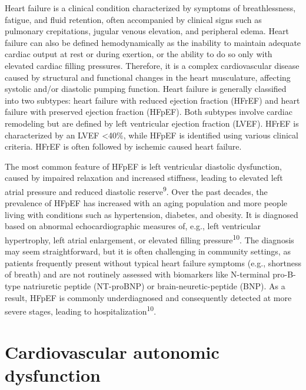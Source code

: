 \documentclass[
  a4paper,
  headsepline=true,
  open=any]{scrbook}
\begin{document}
Heart failure is a clinical condition characterized by symptoms of
breathlessness, fatigue, and fluid retention, often accompanied by
clinical signs such as pulmonary crepitations, jugular venous elevation,
and peripheral edema. Heart failure can also be defined hemodynamically
as the inability to maintain adequate cardiac output at rest or during
exertion, or the ability to do so only with elevated cardiac filling
pressures. Therefore, it is a complex cardiovascular disease caused by
structural and functional changes in the heart musculature, affecting
systolic and/or diastolic pumping function. Heart failure is generally
classified into two subtypes: heart failure with reduced ejection
fraction (HFrEF) and heart failure with preserved ejection fraction
(HFpEF). Both subtypes involve cardiac remodeling but are defined by
left ventricular ejection fraction (LVEF). HFrEF is characterized by an
LVEF \textless40\%, while HFpEF is identified using various clinical
criteria. HFrEF is often followed by ischemic caused heart failure.

The most common feature of HFpEF is left ventricular diastolic
dysfunction, caused by impaired relaxation and increased stiffness,
leading to elevated left atrial pressure and reduced diastolic
reserve\textsuperscript{9}. Over the past decades, the prevalence of
HFpEF has increased with an aging population and more people living with
conditions such as hypertension, diabetes, and obesity. It is diagnosed
based on abnormal echocardiographic measures of, e.g., left ventricular
hypertrophy, left atrial enlargement, or elevated filling
pressure\textsuperscript{10}. The diagnosis may seem straightforward,
but it is often challenging in community settings, as patients
frequently present without typical heart failure symptoms (e.g.,
shortness of breath) and are not routinely assessed with biomarkers like
N-terminal pro-B-type natriuretic peptide (NT-proBNP) or
brain-neuretic-peptide (BNP). As a result, HFpEF is commonly
underdiagnosed and consequently detected at more severe stages, leading
to hospitalization\textsuperscript{10}.

\hypertarget{cardiovascular-autonomic-dysfunction}{%
\section{Cardiovascular autonomic
dysfunction}\label{cardiovascular-autonomic-dysfunction}}
\end{document}
